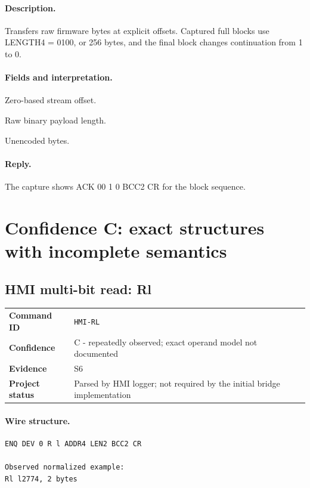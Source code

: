 \documentclass[10pt,letterpaper]{article}
\begin{document}
\paragraph{Description.} Transfers raw firmware bytes at explicit offsets. Captured full blocks use LENGTH4 = 0100, or 256 bytes, and the final block changes continuation from 1 to 0.
\paragraph{Fields and interpretation.}
\begin{description}[style=nextline,leftmargin=3.2cm,labelwidth=3.0cm,font=\normalfont\bfseries]
\item[OFFSET8] Zero-based stream offset.
\item[LENGTH4] Raw binary payload length.
\item[BINARY\_DATA] Unencoded bytes.
\end{description}
\paragraph{Reply.} The capture shows ACK 00 1 0 BCC2 CR for the block sequence.

\section{Confidence C: exact structures with incomplete semantics}

\subsection{HMI multi-bit read: Rl}
\begin{tabularx}{\textwidth}{@{}>{\bfseries}p{2.8cm}X@{}}
Command ID & \texttt{HMI-RL} \\
Confidence & C - repeatedly observed; exact operand model not documented \\
Evidence & S6 \\
Project status & Parsed by HMI logger; not required by the initial bridge implementation \\
\end{tabularx}
\vspace{0.35em}
\paragraph{Wire structure.}
\begin{Verbatim}[breaklines=true,breakanywhere=true,fontsize=\small]
ENQ DEV 0 R l ADDR4 LEN2 BCC2 CR

Observed normalized example:
Rl l2774, 2 bytes
\end{Verbatim}
\end{document}
